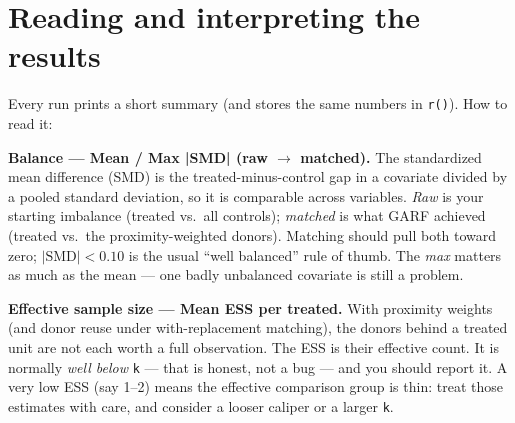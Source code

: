 \documentclass[11pt,a4paper]{article}
\newcommand{\code}[1]{\texttt{#1}}
\begin{document}
\section{Reading and interpreting the results}\label{sec:interpret}

Every run prints a short summary (and stores the same numbers in \code{r()}). How to read it:

\medskip
\noindent\textbf{Balance --- Mean / Max |SMD| (raw $\to$ matched).} The standardized mean
difference (SMD) is the treated-minus-control gap in a covariate divided by a pooled standard
deviation, so it is comparable across variables. \emph{Raw} is your starting imbalance (treated
vs.\ all controls); \emph{matched} is what GARF achieved (treated vs.\ the proximity-weighted
donors). Matching should pull both toward zero; $|\text{SMD}| < 0.10$ is the usual
``well balanced'' rule of thumb. The \emph{max} matters as much as the mean --- one badly
unbalanced covariate is still a problem.

\medskip
\noindent\textbf{Effective sample size --- Mean ESS per treated.} With proximity weights (and
donor reuse under with-replacement matching), the donors behind a treated unit are not each worth
a full observation. The ESS is their effective count. It is normally \emph{well below} \code{k}
--- that is honest, not a bug --- and you should report it. A very low ESS (say 1--2) means the
effective comparison group is thin: treat those estimates with care, and consider a looser
caliper or a larger \code{k}.
\end{document}
